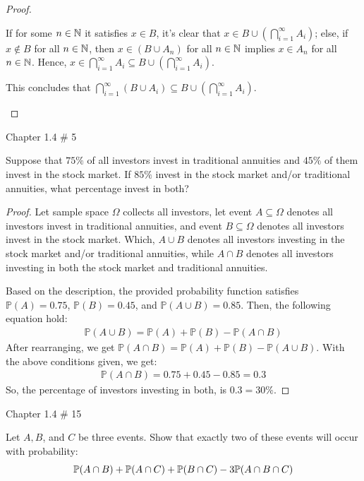 \documentclass{article}
\begin{document}
\begin{proof}
\begin{itemize}
\begin{itemize}
            If for some $n\in\mathbb{N}$ it satisfies $x\in B$, it's clear that $x\in B\cup (\bigcap_{i=1}^\infty A_i)$; else, if $x\notin B$ for all $n\in\mathbb{N}$, then $x\in (B\cup A_n)$ for all $n\in\mathbb{N}$ implies $x\in A_n$ for all $n\in\mathbb{N}$. Hence, $x\in \bigcap_{i=1}^\infty A_i \subseteq B\cup (\bigcap_{i=1}^\infty A_i)$.

            This concludes that $\bigcap_{i=1}^\infty(B\cup A_i)\subseteq B\cup (\bigcap_{i=1}^\infty A_i)$.
        \end{itemize}
    \end{itemize}
\end{proof}

\newpage

\begin{ques}\label{q4}
    Chapter 1.4 \# 5

    Suppose that $75\%$ of all investors invest in traditional annuities and $45\%$ of them invest in the stock market. If $85\%$ invest in the stock market and/or traditional annuities, what percentage invest in both?
\end{ques}

\begin{proof}
    Let sample space $\Omega$ collects all investors, let event $A\subseteq \Omega$ denotes all investors invest in traditional annuities, and event $B\subseteq \Omega$ denotes all investors invest in the stock market. Which, $A\cup B$ denotes all investors investing in the stock market and/or traditional annuities, while $A\cap B$ denotes all investors investing in both the stock market and traditional annuities.

    Based on the description, the provided probability function satisfies $\mathbb{P}(A)=0.75$, $\mathbb{P}(B)=0.45$, and $\mathbb{P}(A\cup B)=0.85$. Then, the following equation hold:
    \begin{align}
        \mathbb{P}(A\cup B)=\mathbb{P}(A)+\mathbb{P}(B)-\mathbb{P}(A\cap B)
    \end{align}
    After rearranging, we get $\mathbb{P}(A\cap B)=\mathbb{P}(A)+\mathbb{P}(B)-\mathbb{P}(A\cup B)$. With the above conditions given, we get:
    \begin{align}
        \mathbb{P}(A\cap B)=0.75+0.45-0.85 = 0.3
    \end{align}
    So, the percentage of investors investing in both, is $0.3 = 30\%$.
\end{proof}

\hfil

\begin{ques}\label{q5}
    Chapter 1.4 \# 15

    Let $A,B$, and $C$ be three events. Show that exactly two of these events will occur with probability:
    $$\mathbb{P}(A\cap B)+\mathbb{P}(A\cap C)+\mathbb{P}(B\cap C)-3\mathbb{P}(A\cap B\cap C)$$
\end{ques}
\end{document}
